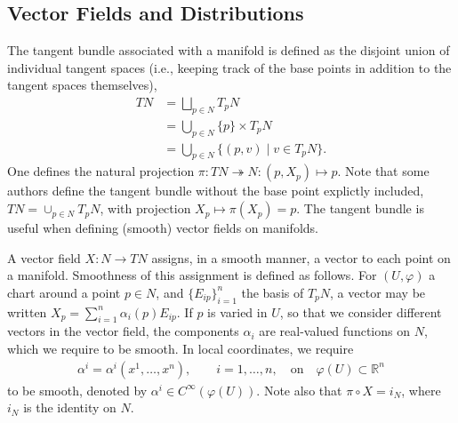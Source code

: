 \documentclass[psamsfonts]{amsart}
\theoremstyle{definition}
\theoremstyle{remark}
\newcommand*\R{\mathds{R}}
\numberwithin{equation}{section}
\begin{document}
\subsection{Vector Fields and Distributions}
The tangent bundle associated with a manifold is defined as the disjoint union of individual tangent spaces (i.e., keeping track of the base points in addition to the tangent spaces themselves), 
\begin{equation}
\begin{aligned}
TN & = {} \bigsqcup_{p \in N} T_pN\\
 & = {} \bigcup_{p \in N} \{p\} \times T_pN\\
 & = {} \bigcup_{p \in N} \{(p, v) \mid v \in T_pN\}.
\end{aligned}
\end{equation}
One defines the natural projection $\pi : TN \twoheadrightarrow N : (p, X_p) \mapsto p$. %
Note that some authors define the tangent bundle without the base point explictly included, $TN = \cup_{p\in N}T_pN$, with projection $X_p \mapsto \pi(X_p) = p$. The tangent bundle is useful when defining (smooth) vector fields on manifolds. 

A vector field $X: N \rightarrow TN$ assigns, in a smooth manner, a vector to each point on a manifold. Smoothness of this assignment is defined as follows. For $(U, \varphi)$ a chart around a point $p\in N$, and $\{E_{ip}\}_{i = 1}^n$ the basis of $T_pN$, a vector may be written $X_p = \sum_{i = 1}^n \alpha_i(p) E_{ip}$. If $p$ is varied in $U$, so that we consider different vectors in the vector field, the components $\alpha_i$ are real-valued functions on $N$, which we require to be smooth. In local coordinates, we require 
\begin{equation}\label{eq:vectorfieldcoeff}
\begin{aligned}
\alpha^i = \alpha^i(x^1, \dots, x^n), \qquad i = 1, \dots, n, \quad \text{on}\quad \varphi(U)\subset \R^n
\end{aligned}
\end{equation} 
to be smooth, denoted by $\alpha^i \in C^{\infty}(\varphi(U))$. Note also that $\pi \circ X = i_N$, where $i_N$ is the identity on $N$. 
\end{document}
